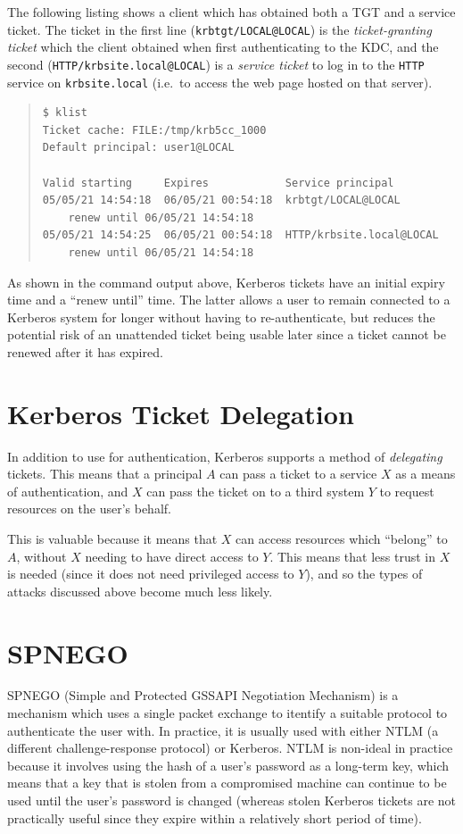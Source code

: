 \documentclass{report}
\begin{document}
The following listing shows a client which has obtained both a TGT and a service ticket. The ticket in the first line (\verb+krbtgt/LOCAL@LOCAL+) is the \textit{ticket-granting ticket} which the client obtained when first authenticating to the KDC, and the second (\verb+HTTP/krbsite.local@LOCAL+) is a \textit{service ticket} to log in to the \verb+HTTP+ service on \verb+krbsite.local+ (i.e.\ to access the web page hosted on that server).

\begin{quote}
\begin{verbatim}
$ klist
Ticket cache: FILE:/tmp/krb5cc_1000
Default principal: user1@LOCAL

Valid starting     Expires            Service principal
05/05/21 14:54:18  06/05/21 00:54:18  krbtgt/LOCAL@LOCAL
	renew until 06/05/21 14:54:18
05/05/21 14:54:25  06/05/21 00:54:18  HTTP/krbsite.local@LOCAL
	renew until 06/05/21 14:54:18
\end{verbatim}
\end{quote}

As shown in the command output above, Kerberos tickets have an initial expiry time and a ``renew until'' time. The latter allows a user to remain connected to a Kerberos system for longer without having to re-authenticate, but reduces the potential risk of an unattended ticket being usable later since a ticket cannot be renewed after it has expired.

\section{Kerberos Ticket Delegation}
In addition to use for authentication, Kerberos supports a method of \textit{delegating} tickets. This means that a principal $A$ can pass a ticket to a service $X$ as a means of authentication, and $X$ can pass the ticket on to a third system $Y$ to request resources on the user's behalf.

This is valuable because it means that $X$ can access resources which ``belong'' to $A$, without $X$ needing to have direct access to $Y$. This means that less trust in $X$ is needed (since it does not need privileged access to $Y$), and so the types of attacks discussed above become much less likely.

\section{SPNEGO}
SPNEGO (Simple and Protected GSSAPI Negotiation Mechanism) is a mechanism which uses a single packet exchange to itentify a suitable protocol to authenticate the user with. In practice, it is usually used with either NTLM (a different challenge-response protocol) or Kerberos. NTLM is non-ideal in practice because it involves using the hash of a user's password as a long-term key, which means that a key that is stolen from a compromised machine can continue to be used until the user's password is changed (whereas stolen Kerberos tickets are not practically useful since they expire within a relatively short period of time).
\end{document}
